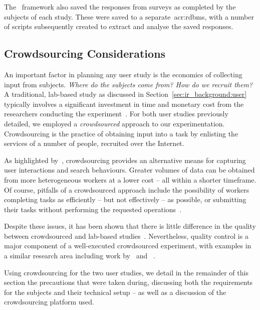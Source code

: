 The \treconomics~framework also saved the responses from surveys as completed by the subjects of each study. These were saved to a separate~\gls{acr:rdbms}, with a number of scripts subsequently created to extract and analyse the saved responses.

\subsection{Crowdsourcing Considerations}\label{sec:methodology:user:crowdsourcing}
An important factor in planning any user study is the economics of collecting input from subjects. \emph{Where do the subjects come from? How do we recruit them?} A traditional, lab-based study as discussed in Section~\ref{sec:ir_background:user} typically involves a significant investment in time and monetary cost from the researchers conducting the experiment~\citep{spool2001testing}. For both user studies previously detailed, we employed a \emph{crowdsourced} approach to our experimentation. Crowdsourcing is the practice of obtaining input into a task by enlisting the services of a number of people, recruited over the Internet.

As highlighted by~\cite{zuccon2013crowdsourcing_comparisons}, crowdsourcing provides an alternative means for capturing user interactions and search behaviours. Greater volumes of data can be obtained from more heterogeneous workers at a lower cost -- all within a shorter timeframe. Of course, pitfalls of a crowdsourced approach include the possibility of workers completing tasks as efficiently -- but not effectively -- as possible, or submitting their tasks without performing the requested operations~\citep{feild2010turkers}.

Despite these issues, it has been shown that there is little difference in the quality between crowdsourced and lab-based studies~\citep{kely2011user_study, zuccon2013crowdsourcing_comparisons}. Nevertheless, quality control is a major component of a well-executed crowdsourced experiment, with examples in a similar research area including work by~\cite{kazai2011crowdsourced} and ~\cite{crescenzi2013crowdsourced}.

Using crowdsourcing for the two user studies, we detail in the remainder of this section the precautions that were taken during, discussing both the requirements for the subjects and their technical setup -- as well as a discussion of the crowdsourcing platform used.

